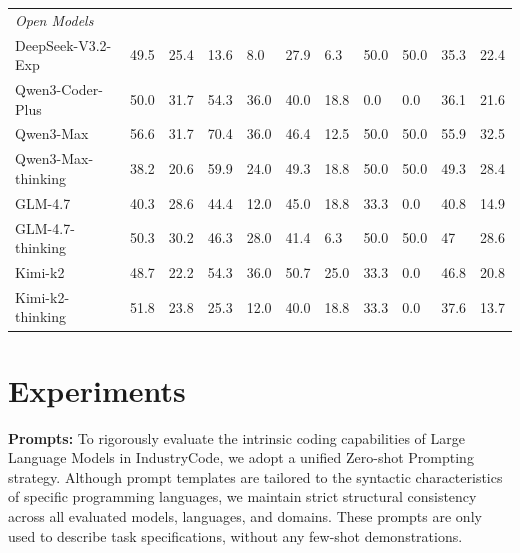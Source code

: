 \documentclass{article}
\theoremstyle{plain}
\theoremstyle{definition}
\theoremstyle{remark}
\begin{document}
\begin{table}[t]
\begin{center}
\begin{small}
\begin{tabularx}{\textwidth}{lYYYYYYYYYY}
        \midrule
        \textit{Open Models} & & & & & & & & & & \\
        \hspace{1em}DeepSeek-V3.2-Exp    & 49.5 & 25.4 & 13.6 & 8.0  & 27.9 & 6.3    & 50.0 & 50.0 & 35.3 & 22.4 \\
        \hspace{1em}Qwen3-Coder-Plus     & 50.0 & 31.7 & 54.3 & 36.0 & 40.0 & 18.8 & 0.0    & 0.0    & 36.1 & 21.6 \\
        \hspace{1em}Qwen3-Max            & 56.6 & 31.7 & 70.4 & 36.0 & 46.4 & 12.5 & 50.0 & 50.0    & 55.9 & 32.5 \\
        \hspace{1em}Qwen3-Max-thinking   & 38.2 & 20.6 & 59.9 & 24.0 & 49.3 & 18.8 & 50.0 & 50.0    & 49.3 & 28.4 \\
        
        \hspace{1em}GLM-4.7              & 40.3 & 28.6 & 44.4 & 12.0 & 45.0 & 18.8 & 33.3 & 0.0    & 40.8 & 14.9 \\
        \hspace{1em}GLM-4.7-thinking     & 50.3 & 30.2 & 46.3 & 28.0 & 41.4 & 6.3  & 50.0 & 50.0 & 47 & 28.6 \\
        \hspace{1em}Kimi-k2              & 48.7 & 22.2 & 54.3 & 36.0 & 50.7 & 25.0 & 33.3 & 0.0    & 46.8 & 20.8 \\
        \hspace{1em}Kimi-k2-thinking     & 51.8 & 23.8 & 25.3 & 12.0 & 40.0 & 18.8 & 33.3 & 0.0    & 37.6 & 13.7 \\

        \bottomrule
      \end{tabularx}
    \end{small}
  \end{center}
  \vskip -0.1in
\end{table}


\section{Experiments}
\textbf{Prompts:} To rigorously evaluate the intrinsic coding capabilities of Large Language Models in IndustryCode, we adopt a unified Zero-shot Prompting strategy. Although prompt templates are tailored to the syntactic characteristics of specific programming languages, we maintain strict structural consistency across all evaluated models, languages, and domains. These prompts are only used to describe task specifications, without any few-shot demonstrations.
\end{document}

